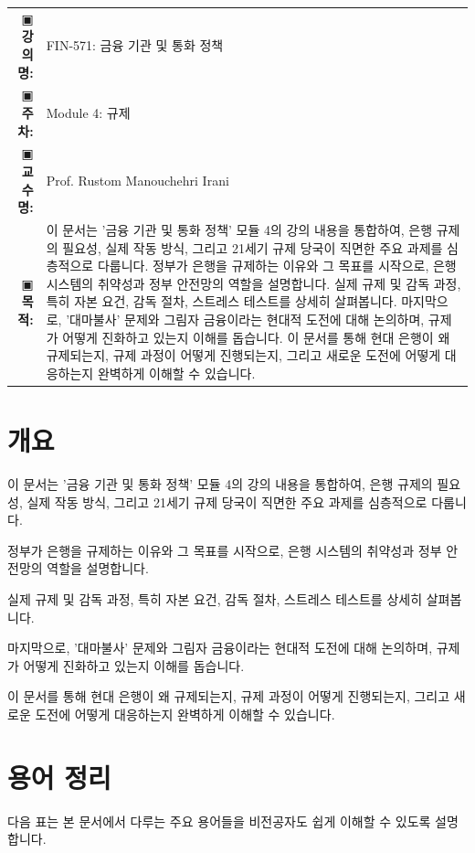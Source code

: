 \documentclass[11pt,a4paper]{article}
\makeatletter
\theoremstyle{definition}
\newcommand{\metainfo}[4]{
\begin{tcolorbox}[
    colback=lightpurple,
    colframe=darkpurple,
    boxrule=1pt,
    arc=2mm,
    left=10pt,
    right=10pt,
    top=8pt,
    bottom=8pt
]
\begin{tabular}{@{}rl@{}}
▣ \textbf{강의명:} & #1 \\[0.3em]
▣ \textbf{주차:} & #2 \\[0.3em]
▣ \textbf{교수명:} & #3 \\[0.3em]
▣ \textbf{목적:} & \begin{minipage}[t]{0.75\textwidth}#4\end{minipage}
\end{tabular}
\end{tcolorbox}
}
\makeatother
\begin{document}
\thispagestyle{firstpage}

\metainfo{FIN-571: 금융 기관 및 통화 정책}{Module 4: 규제}{Prof. Rustom Manouchehri Irani}{이 문서는 '금융 기관 및 통화 정책' 모듈 4의 강의 내용을 통합하여, 은행 규제의 필요성, 실제 작동 방식, 그리고 21세기 규제 당국이 직면한 주요 과제를 심층적으로 다룹니다. 정부가 은행을 규제하는 이유와 그 목표를 시작으로, 은행 시스템의 취약성과 정부 안전망의 역할을 설명합니다. 실제 규제 및 감독 과정, 특히 자본 요건, 감독 절차, 스트레스 테스트를 상세히 살펴봅니다. 마지막으로, '대마불사' 문제와 그림자 금융이라는 현대적 도전에 대해 논의하며, 규제가 어떻게 진화하고 있는지 이해를 돕습니다. 이 문서를 통해 현대 은행이 왜 규제되는지, 규제 과정이 어떻게 진행되는지, 그리고 새로운 도전에 어떻게 대응하는지 완벽하게 이해할 수 있습니다.}

\tableofcontents

\newpage
\section{개요}

\begin{summarybox}[title=모듈 4: 규제 개요]
이 문서는 '금융 기관 및 통화 정책' 모듈 4의 강의 내용을 통합하여, 은행 규제의 필요성, 실제 작동 방식, 그리고 21세기 규제 당국이 직면한 주요 과제를 심층적으로 다룹니다.

정부가 은행을 규제하는 이유와 그 목표를 시작으로, 은행 시스템의 취약성과 정부 안전망의 역할을 설명합니다.

실제 규제 및 감독 과정, 특히 자본 요건, 감독 절차, 스트레스 테스트를 상세히 살펴봅니다.

마지막으로, '대마불사' 문제와 그림자 금융이라는 현대적 도전에 대해 논의하며, 규제가 어떻게 진화하고 있는지 이해를 돕습니다.

이 문서를 통해 현대 은행이 왜 규제되는지, 규제 과정이 어떻게 진행되는지, 그리고 새로운 도전에 어떻게 대응하는지 완벽하게 이해할 수 있습니다.
\end{summarybox}

\newpage
\section{용어 정리}

다음 표는 본 문서에서 다루는 주요 용어들을 비전공자도 쉽게 이해할 수 있도록 설명합니다.
\end{document}
